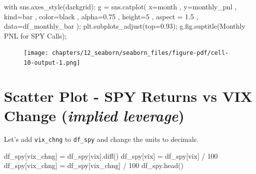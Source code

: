 \documentclass[
  letterpaper,
  DIV=11,
  numbers=noendperiod]{scrreprt}
\newenvironment{Shaded}{\begin{snugshade}}{\end{snugshade}}
\newcommand{\ControlFlowTok}[1]{\textcolor[rgb]{0.00,0.23,0.31}{#1}}
\newcommand{\DecValTok}[1]{\textcolor[rgb]{0.68,0.00,0.00}{#1}}
\newcommand{\FloatTok}[1]{\textcolor[rgb]{0.68,0.00,0.00}{#1}}
\newcommand{\NormalTok}[1]{\textcolor[rgb]{0.00,0.23,0.31}{#1}}
\newcommand{\OperatorTok}[1]{\textcolor[rgb]{0.37,0.37,0.37}{#1}}
\newcommand{\StringTok}[1]{\textcolor[rgb]{0.13,0.47,0.30}{#1}}
\begin{document}
\begin{Shaded}
\begin{Highlighting}[]
\ControlFlowTok{with}\NormalTok{ sns.axes\_style(}\StringTok{\textquotesingle{}darkgrid\textquotesingle{}}\NormalTok{):}
\NormalTok{    g }\OperatorTok{=}\NormalTok{ sns.catplot(}
\NormalTok{        x}\OperatorTok{=}\StringTok{\textquotesingle{}month\textquotesingle{}}
\NormalTok{        , y}\OperatorTok{=}\StringTok{\textquotesingle{}monthly\_pnl\textquotesingle{}}
\NormalTok{        , kind}\OperatorTok{=}\StringTok{\textquotesingle{}bar\textquotesingle{}}
\NormalTok{        , color}\OperatorTok{=}\StringTok{\textquotesingle{}black\textquotesingle{}}
\NormalTok{        , alpha}\OperatorTok{=}\FloatTok{0.75}
\NormalTok{        , height}\OperatorTok{=}\DecValTok{5}
\NormalTok{        , aspect }\OperatorTok{=} \FloatTok{1.5}
\NormalTok{        , data}\OperatorTok{=}\NormalTok{df\_monthly\_bar}
\NormalTok{    )}\OperatorTok{;}
\NormalTok{    plt.subplots\_adjust(top}\OperatorTok{=}\FloatTok{0.93}\NormalTok{)}\OperatorTok{;}
\NormalTok{    g.fig.suptitle(}\StringTok{\textquotesingle{}Monthly PNL for SPY Calls\textquotesingle{}}\NormalTok{)}\OperatorTok{;}
\end{Highlighting}
\end{Shaded}

\begin{figure}[H]

{\centering \texttt{[image: chapters/12\_seaborn/seaborn\_files/figure-pdf/cell-10-output-1.png]}

}

\end{figure}

\hypertarget{scatter-plot---spy-returns-vs-vix-change-implied-leverage}{%
\section{\texorpdfstring{Scatter Plot - SPY Returns vs VIX Change
(\emph{implied
leverage})}{Scatter Plot - SPY Returns vs VIX Change (implied leverage)}}\label{scatter-plot---spy-returns-vs-vix-change-implied-leverage}}

Let's add \texttt{vix\_chng} to \texttt{df\_spy} and change the units to
decimals.

\begin{Shaded}
\begin{Highlighting}[]
\NormalTok{df\_spy[}\StringTok{\textquotesingle{}vix\_chng\textquotesingle{}}\NormalTok{] }\OperatorTok{=}\NormalTok{ df\_spy[}\StringTok{\textquotesingle{}vix\textquotesingle{}}\NormalTok{].diff()}
\NormalTok{df\_spy[}\StringTok{\textquotesingle{}vix\textquotesingle{}}\NormalTok{] }\OperatorTok{=}\NormalTok{ df\_spy[}\StringTok{\textquotesingle{}vix\textquotesingle{}}\NormalTok{] }\OperatorTok{/} \DecValTok{100}
\NormalTok{df\_spy[}\StringTok{\textquotesingle{}vix\_chng\textquotesingle{}}\NormalTok{] }\OperatorTok{=}\NormalTok{ df\_spy[}\StringTok{\textquotesingle{}vix\_chng\textquotesingle{}}\NormalTok{] }\OperatorTok{/} \DecValTok{100}
\NormalTok{df\_spy.head()}
\end{Highlighting}
\end{Shaded}
\end{document}
